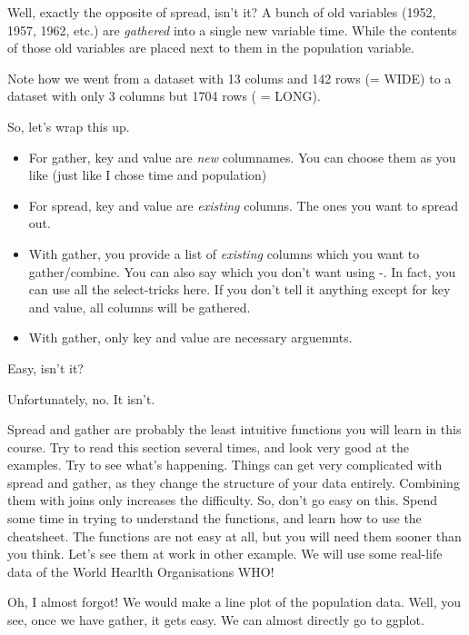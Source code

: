 \documentclass[]{tufte-book}
\providecommand{\tightlist}{%
  \setlength{\itemsep}{0pt}\setlength{\parskip}{0pt}}
\begin{document}
Well, exactly the opposite of spread, isn't it? A bunch of old variables (1952, 1957, 1962, etc.) are \emph{gathered} into a single new variable time. While the contents of those old variables are placed next to them in the population variable.

Note how we went from a dataset with 13 colums and 142 rows (= WIDE) to a dataset with only 3 columns but 1704 rows ( = LONG).

So, let's wrap this up.

\begin{itemize}
\tightlist
\item
  For gather, key and value are \emph{new} columnames. You can choose them as you like (just like I chose time and population)
\item
  For spread, key and value are \emph{existing} columns. The ones you want to spread out.
\item
  With gather, you provide a list of \emph{existing} columns which you want to gather/combine. You can also say which you don't want using -. In fact, you can use all the select-tricks here. If you don't tell it anything except for key and value, all columns will be gathered.
\item
  With gather, only key and value are necessary arguemnts.
\end{itemize}

Easy, isn't it?

Unfortunately, no. It isn't.

Spread and gather are probably the least intuitive functions you will learn in this course. Try to read this section several times, and look very good at the examples. Try to see what's happening. Things can get very complicated with spread and gather, as they change the structure of your data entirely. Combining them with joins only increases the difficulty. So, don't go easy on this. Spend some time in trying to understand the functions, and learn how to use the cheatsheet. The functions are not easy at all, but you will need them sooner than you think. Let's see them at work in other example. We will use some real-life data of the World Hearlth Organisations WHO!

Oh, I almost forgot! We would make a line plot of the population data. Well, you see, once we have gather, it gets easy. We can almost directly go to ggplot.
\end{document}

